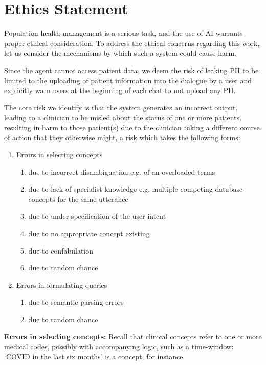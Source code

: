 \documentclass[11pt]{article}
\begin{document}
\section{Ethics Statement}
Population health management is a serious task, and the use of AI warrants proper ethical consideration.
To address the ethical concerns regarding this work, let us consider the mechanisms by which such a system could cause harm.

Since the agent cannot access patient data, we deem the risk of leaking PII to be limited to the uploading of patient information into the dialogue by a user and explicitly warn users at the beginning of each chat to not upload any PII.

The core risk we identify is that the system generates an incorrect output, leading to a clinician to be misled about the status of one or more patients, resulting in harm to those patient(s) due to the clinician taking a different course of action that they otherwise might, a risk which takes the following forms:

\begin{enumerate}
	\item Errors in selecting concepts
	\begin{enumerate}
		\item due to incorrect disambiguation e.g. of an overloaded terms
		\item due to lack of specialist knowledge e.g. multiple competing database concepts for the same utterance   
		\item due to under-specification of the user intent
		\item due to no appropriate concept existing 
		\item due to confabulation
		\item due to random chance
	\end{enumerate}
	\item Errors in formulating queries
	\begin{enumerate}
		\item due to semantic parsing errors 
		\item due to random chance
	\end{enumerate}
\end{enumerate}

\textbf{Errors in selecting concepts:}
Recall that clinical concepts refer to one or more medical codes, possibly with accompanying logic, such as a time-window: `COVID in the last six months' is a concept, for instance.
\end{document}
